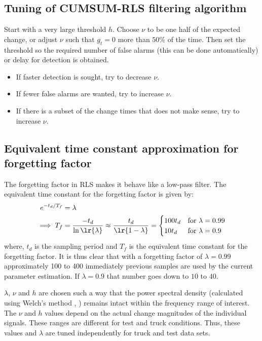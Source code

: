 \subsection{Tuning of CUMSUM-RLS filtering algorithm \cite{gustafsson2000adaptive}}
Start with a very large threshold $h$. Choose $\nu$ to be one half of the expected change, or adjust $\nu$ such that $g_t = 0$ more than $50\%$ of the time. Then set the threshold so the required number of false alarms (this can be done automatically) or delay for detection is obtained.
\begin{itemize}
        \item If faster detection is sought, try to decrease $\nu$.
        \item If fewer false alarms are wanted, try to increase $\nu$.
        \item If there is a subset of the change times that does not make sense, try to increase $\nu$.
\end{itemize}

\subsection{Equivalent time constant approximation for forgetting factor \cite{sys_id_notes}}
The forgetting factor in RLS makes it behave like a low-pass filter. The equivalent time constant for the forgetting factor is given by:
\begin{align*}
        e^{-t_d/T_f} &= \lambda\\
        \implies T_f &= \frac{-t_d}{\ln \lr{\lambda}} \approx \frac{t_d}{\lr{1-\lambda}} = \begin{cases}
                100 t_d & \text{for } \lambda = 0.99\\
                10 t_d & \text{for } \lambda = 0.9
        \end{cases}
\end{align*}
where, $t_d$ is the sampling period and $T_f$ is the equivalent time constant for the forgetting factor. It is thus clear that with a forgetting factor of $\lambda = 0.99$ approximately 100 to 400 immediately  previous samples are used by the current parameter estimation. If $\lambda = 0.9$ that number goes down to $10$ to $40$.


\par $\lambda$, $\nu$ and $h$ are chosen such a way that the power spectral density (calculated using Welch's method \cite{welch1967use}, \cite{bartlett1950periodogram}) remains intact within the frequency range of interest. The $\nu$ and $h$ values depend on the actual change magnitudes of the individual signals. These ranges are different for test and truck conditions. Thus, these values and $\lambda$ are tuned independently for truck and test data sets.
